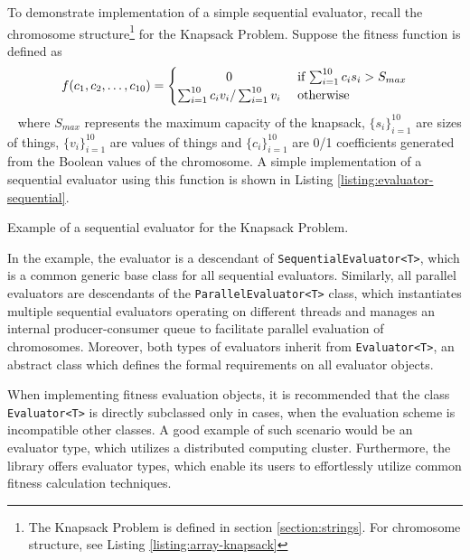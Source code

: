 To demonstrate implementation of a simple sequential evaluator, recall the chromosome structure\footnote{The Knapsack Problem is defined in section \ref{section:strings}. For chromosome structure, see Listing \ref{listing:array-knapsack}} for the Knapsack Problem. Suppose the fitness function is defined as
~
\begin{align}
	f(c_1, c_2, \dots, c_{10})
	=
	\begin{cases} 
		\hfill 0 \hfill & \text{ if $\sum_{i=1}^{10} c_i s_i>S_{max}$} \\
		\hfill \sum_{i=1}^{10} c_i v_i / \sum_{i=1}^{10} v_i \hfill & \text{ otherwise} \\
	\end{cases}
\end{align}
~
where $S_{max}$ represents the maximum capacity of the knapsack, $\{s_i\}_{i=1}^{10}$ are sizes of things, $\{v_i\}_{i=1}^{10}$ are values of things and $\{c_i\}_{i=1}^{10}$ are 0/1 coefficients generated from the Boolean values of the chromosome. A simple implementation of a sequential evaluator using this function is shown in Listing \ref{listing:evaluator-sequential}.

\begin{listing}[ht]
	\caption{Example of a sequential evaluator for the Knapsack Problem.}
	\label{listing:evaluator-sequential}
\end{listing}

In the example, the evaluator is a descendant of \texttt{SequentialEvaluator<T>}, which is a common generic base class for all sequential evaluators. Similarly, all parallel evaluators are descendants of the \texttt{ParallelEvaluator<T>} class, which instantiates multiple sequential evaluators operating on different threads and manages an internal producer-consumer queue to facilitate parallel evaluation of chromosomes. Moreover, both types of evaluators inherit from \texttt{Evaluator<T>}, an abstract class which defines the formal requirements on all evaluator objects.

When implementing fitness evaluation objects, it is recommended that the class \texttt{Evaluator<T>} is directly subclassed only in cases, when the evaluation scheme is incompatible other classes. A good example of such scenario would be an evaluator type, which utilizes a distributed computing cluster. Furthermore, the library offers evaluator types, which enable its users to effortlessly utilize common fitness calculation techniques.

